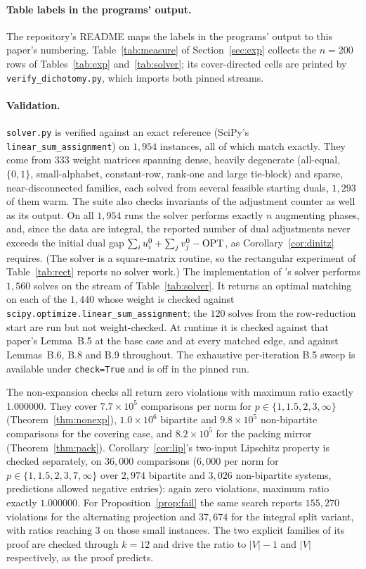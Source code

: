 \paragraph{Table labels in the programs' output.} The repository's README maps the labels in the
programs' output to this paper's numbering. Table~\ref{tab:measure} of Section~\ref{sec:exp}
collects the $n = 200$ rows of Tables~\ref{tab:exp} and~\ref{tab:solver}; its cover-directed cells
are printed by \texttt{verify\_dichotomy.py}, which imports both pinned streams.

\paragraph{Validation.} \texttt{solver.py} is verified against an exact reference
(SciPy's \texttt{linear\_sum\_\allowbreak{}assignment}) on $1{,}954$ instances, all of which match
exactly. They come from $333$ weight matrices spanning dense, heavily degenerate (all-equal,
$\{0,1\}$, small-alphabet, constant-row, rank-one and large tie-block) and sparse, near-disconnected
families, each solved from several feasible starting duals, $1{,}293$ of them warm. The suite also
checks invariants of the adjustment counter as well as its output. On all $1{,}954$ runs the solver
performs exactly $n$ augmenting phases, and, since the data are integral, the reported number of
dual adjustments never exceeds the initial dual gap $\sum_i u^0_i + \sum_j v^0_j - \mathrm{OPT}$, as
Corollary~\ref{cor:dinitz} requires. (The solver is a square-matrix routine, so the rectangular
experiment of Table~\ref{tab:rect} reports no solver work.)
The implementation of \citeauthor{chen2022}'s solver performs $1{,}560$ solves on the stream
of Table~\ref{tab:solver}. It returns an optimal matching on each of the $1{,}440$ whose
weight is checked against \texttt{scipy.optimize.linear\_sum\_assignment}; the $120$ solves from
the row-reduction start are run but not weight-checked. At runtime it is checked against that
paper's Lemma~B.5 at the base case and at every matched edge, and against Lemmas~B.6, B.8 and B.9
throughout. The exhaustive per-iteration B.5 sweep is available under \texttt{check=True} and is
off in the pinned run.

The non-expansion checks all return zero violations with maximum ratio exactly 1.000000.
They cover $7.7\times10^5$ comparisons per norm for $p \in \{1, 1.5, 2, 3, \infty\}$
(Theorem~\ref{thm:nonexp}), $1.0\times10^6$ bipartite and $9.8\times10^5$ non-bipartite comparisons
for the covering case, and $8.2\times10^5$ for the packing mirror (Theorem~\ref{thm:pack}).
Corollary~\ref{cor:lip}'s two-input Lipschitz property is checked separately, on $36{,}000$
comparisons ($6{,}000$ per norm for $p \in \{1,1.5,2,3,7,\infty\}$ over $2{,}974$ bipartite and
$3{,}026$ non-bipartite systems, predictions allowed negative entries): again zero violations,
maximum ratio exactly $1.000000$. For Proposition~\ref{prop:fail} the same search reports
$155{,}270$ violations for the alternating projection and $37{,}674$ for the integral split
variant, with ratios reaching $3$ on those small instances. The two explicit families of its proof
are checked through $k = 12$ and drive the ratio to $|V| - 1$ and $|V|$ respectively, as the proof
predicts.

